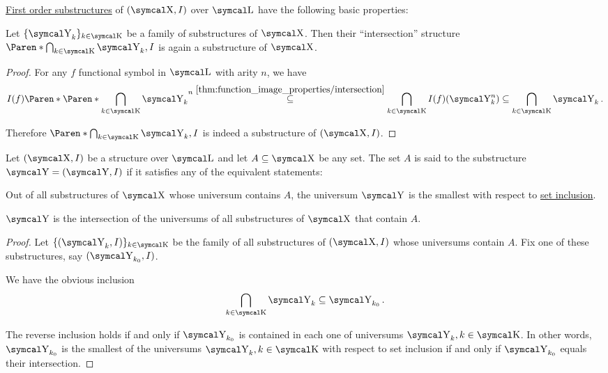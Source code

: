 \begin{proposition}\label{thm:first_order_substructure_properties}
  \hyperref[def:first_order_substructure]{First order substructures} of \( (\CX, I) \) over \( \CL \) have the following basic properties:
  \begin{PropEnum}
     Let \( \{ \CY_k \}_{k \in \CK} \) be a family of substructures of \( \CX \). Then their \enquote{intersection} structure \( \Paren*{\bigcap_{k \in \CK} \CY_k, I} \) is again a substructure of \( \CX \).
  \end{PropEnum}
\end{proposition}
\begin{proof}
   For any \( f \) functional symbol in \( \CL \) with arity \( n \), we have
  \begin{equation*}
    I(f)\Paren*{\Paren*{\bigcap_{k \in \CK} \CY_k}^n}
    \overset {\ref{thm:function_image_properties/intersection}} \subseteq
    \bigcap_{k \in \CK} I(f)(\CY_k^n) \subseteq \bigcap_{k \in \CK} \CY_k.
  \end{equation*}

  Therefore \( \Paren*{\bigcap_{k \in \CK} \CY_k, I} \) is indeed a substructure of \( (\CX, I) \).
\end{proof}

\begin{definition}\label{def:first_order_generated_substructure}
  Let \( (\CX, I) \) be a structure over \( \CL \) and let \( A \subseteq \CX \) be any set. The set \( A \) is said to  the substructure \( \CY = (\CY, I) \) if it satisfies any of the equivalent statements:
  \begin{ThmEnum}
     Out of all substructures of \( \CX \) whose universum contains \( A \), the universum \( \CY \) is the smallest with respect to \hyperref[def:subset]{set inclusion}.

     \( \CY \) is the intersection of the universums of all substructures of \( \CX \) that contain \( A \).
  \end{ThmEnum}
\end{definition}
\begin{proof}
  Let \( \{ (\CY_k, I) \}_{k \in \CK} \) be the family of all substructures of \( (\CX, I) \) whose universums contain \( A \). Fix one of these substructures, say \( (\CY_{k_0}, I) \).

  We have the obvious inclusion
  \begin{equation*}
    \bigcap_{k \in \CK} \CY_k \subseteq \CY_{k_0}.
  \end{equation*}

  The reverse inclusion holds if and only if \( \CY_{k_0} \) is contained in each one of universums \( \CY_k, k \in \CK \). In other words, \( \CY_{k_0} \) is the smallest of the universums \( \CY_k, k \in \CK \) with respect to set inclusion if and only if \( \CY_{k_0} \) equals their intersection.
\end{proof}

